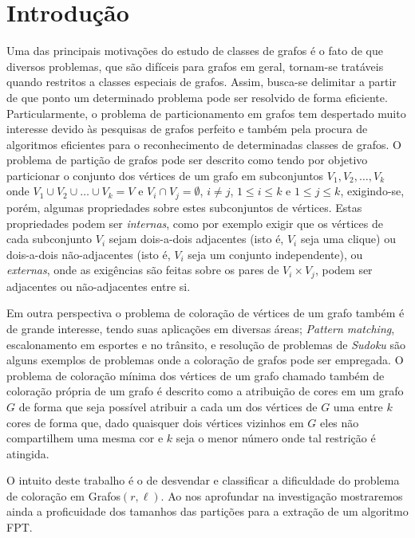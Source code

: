\chapter{Introdução} \label{cap:intro}

Uma das principais motivações do estudo de classes de grafos é o fato de que diversos problemas, que são difíceis para grafos em geral, tornam-se tratáveis quando restritos a classes especiais de grafos. Assim, busca-se delimitar a partir de que ponto um determinado problema pode ser resolvido de forma eficiente. 
Particularmente, o problema de particionamento em grafos tem despertado muito interesse devido às pesquisas de grafos perfeito e também pela procura de algoritmos eficientes para o reconhecimento de determinadas classes de grafos.
O problema de partição de grafos pode ser descrito como tendo por objetivo particionar o conjunto dos vértices de um grafo em subconjuntos $V_1,V_2, 
\ldots, V_k$ onde $V_1 \cup V_2 \cup \ldots \cup V_k = V$ e $V_i \cap V_j = \emptyset$, $i \neq j$, $1 \leq i \leq k$ e $1 \leq j \leq k$, exigindo-se, porém, algumas propriedades sobre estes subconjuntos de vértices. Estas propriedades podem ser \textit{internas}, como por exemplo exigir que os vértices de cada subconjunto $V_i$ sejam dois-a-dois adjacentes (isto é, $V_i$ seja uma clique) ou dois-a-dois não-adjacentes (isto é, $V_i$ seja um conjunto independente), ou \textit{externas}, onde as exigências são feitas sobre os pares de $V_i\times V_j$, podem ser adjacentes ou não-adjacentes entre si. 

Em outra perspectiva o problema de coloração de vértices de um grafo também é de grande interesse, tendo suas aplicações em diversas áreas; \emph{Pattern matching}, escalonamento em esportes e no trânsito, e resolução de problemas de \emph{Sudoku} são alguns exemplos de problemas onde a coloração de grafos pode ser empregada\cite{lewis15}. O problema de coloração mínima dos vértices de um grafo chamado também de coloração própria de um grafo é descrito como a atribuição de cores em um grafo $G$ de forma que seja possível atribuir a cada um dos vértices de $G$ uma entre $k$ cores de forma que, dado quaisquer dois vértices vizinhos em $G$ eles não compartilhem uma mesma cor e $k$ seja o menor número onde tal restrição é atingida.


O intuito deste trabalho é o de desvendar e classificar a dificuldade do problema de coloração em Grafos$(r,\ell)$. Ao nos aprofundar na investigação mostraremos ainda a proficuidade dos tamanhos das partições para a extração de um algoritmo FPT. 

